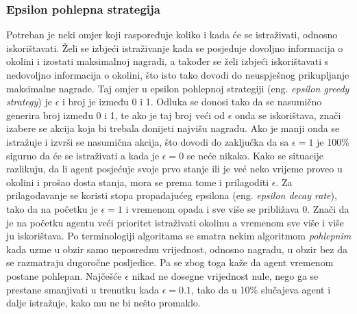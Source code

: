 \subsubsection{Epsilon pohlepna strategija}
Potreban je neki omjer koji raspoređuje koliko i kada će se istraživati, odnosno iskorištavati. Želi se izbjeći istraživanje kada se posjeduje dovoljno informacija o okolini i izostati maksimalnoj nagradi, a također se želi izbjeći iskorištavati s nedovoljno informacija o okolini, što isto tako dovodi do neuspješnog prikupljanje maksimalne nagrade. Taj omjer u epsilon pohlepnoj strategiji (eng. \textit{epsilon greedy strategy}) je $\epsilon$ i broj je između 0 i 1. Odluka se donosi tako da se nasumično generira broj između 0 i 1, te ako je taj broj veći od $\epsilon$ onda se iskorištava, znači izabere se akcija koja bi trebala donijeti najvišu nagradu. Ako je manji onda se istražuje i izvrši se nasumična akcija, što dovodi do zaključka da sa $\epsilon = 1$ je 100\% sigurno da će se istraživati a kada je $\epsilon = 0$ se neće nikako. Kako se situacije razlikuju, da li agent posjećuje svoje prvo stanje ili je već neko vrijeme proveo u okolini i prošao dosta stanja, mora se prema tome i prilagoditi $\epsilon$. Za prilagođavanje se koristi stopa propadajućeg epsilona (eng. \textit{epsilon decay rate}), tako da na početku je $\epsilon = 1$ i vremenom opada i sve više se približava 0. Znači da je na početku agentu veći prioritet istraživati okolinu a vremenom sve više i više ju iskorištava. Po terminologiji algoritama se smatra nekim algoritmom \emph{pohlepnim} kada uzme u obzir samo neposrednu vrijednost, odnosno nagradu, u obzir bez da se razmatraju dugoročne posljedice. Pa se zbog toga kaže da agent vremenom postane pohlepan. Najčešće $\epsilon$ nikad ne dosegne vrijednost nule, nego ga se prestane smanjivati u trenutku kada $\epsilon = 0.1$, tako da u 10\% slučajeva agent i dalje istražuje, kako mu ne bi nešto promaklo.

